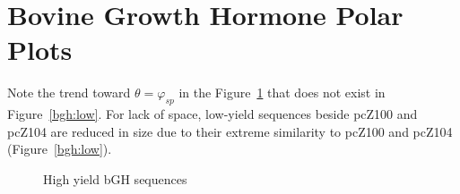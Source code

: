 \documentclass[10pt,twocolumn,draft]{article}
\begin{document}


\onecolumn
\appendix
\section{Bovine Growth Hormone Polar Plots}

Note the trend toward $\theta = \varphi_{sp}$ in the Figure~\ref{bgh:high} that does
not exist in Figure~\ref{bgh:low}. For lack of space, low-yield sequences beside pcZ100 and pcZ104
are reduced in size due to their extreme similarity to pcZ100 and pcZ104 (Figure~\ref{bgh:low}).

\begin{figure}[htp]
    \centering
    \caption{High yield bGH sequences}
    \label{bgh:high}
\end{figure}
\end{document}
